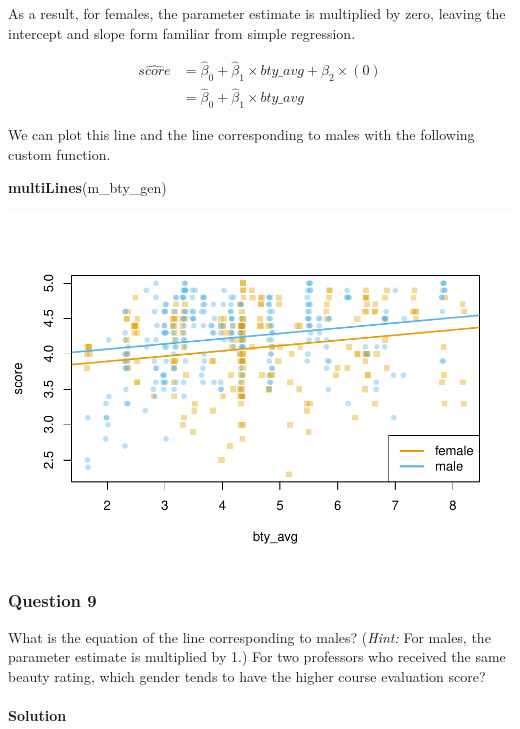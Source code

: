 \documentclass[]{article}
\newenvironment{Shaded}{\begin{snugshade}}{\end{snugshade}}
\newcommand{\KeywordTok}[1]{\textcolor[rgb]{0.13,0.29,0.53}{\textbf{#1}}}
\newcommand{\NormalTok}[1]{#1}
\let\oldparagraph\paragraph
\renewcommand{\paragraph}[1]{\oldparagraph{#1}\mbox{}}
\begin{document}
As a result, for females, the parameter estimate is multiplied by zero,
leaving the intercept and slope form familiar from simple regression.

\[
  \begin{aligned}
\widehat{score} &= \hat{\beta}_0 + \hat{\beta}_1 \times bty\_avg + \hat{\beta}_2 \times (0) \\
&= \hat{\beta}_0 + \hat{\beta}_1 \times bty\_avg\end{aligned}
\]

We can plot this line and the line corresponding to males with the
following custom function.

\begin{Shaded}
\begin{Highlighting}[]
\KeywordTok{multiLines}\NormalTok{(m_bty_gen)}
\end{Highlighting}
\end{Shaded}

\includegraphics{multiple_regression_files/figure-latex/twoLines-1.pdf}

\subsubsection{Question 9}\label{question-9}

What is the equation of the line corresponding to males? (\emph{Hint:}
For males, the parameter estimate is multiplied by 1.) For two
professors who received the same beauty rating, which gender tends to
have the higher course evaluation score?

\paragraph{Solution}\label{solution-8}
\end{document}
